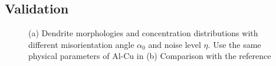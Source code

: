 \documentclass[final,times]{elsarticle}
\numberwithin{equation}{section}
\begin{document}
\subsection{Validation}




 \begin{figure}[!ht]
 \centering
     \hfill
     
     \caption{(a) Dendrite morphologies and concentration distributions with different misorientation angle $\alpha_0$ and noise level $\eta$. Use the same physical parameters of Al-Cu in \cite{Takaki2014}(b) Comparison with the reference \cite{Takaki2014}}
     \label{fig:Ech}
   \end{figure}
   



   













\end{document}
